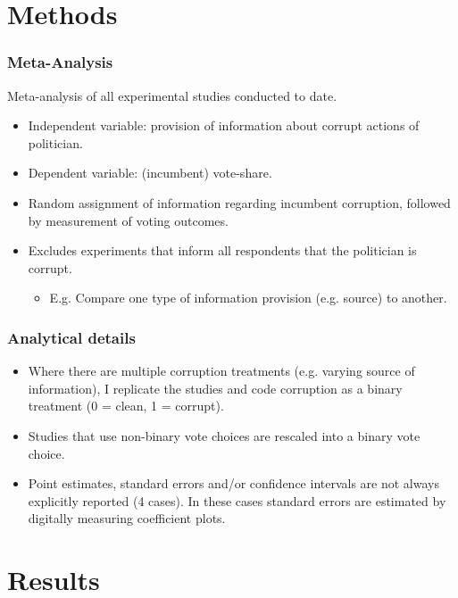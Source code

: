 \documentclass[usenames,dvipsnames]{beamer}
\begin{document}

\section{Methods}

\begin{frame}
\frametitle{Meta-Analysis}
Meta-analysis of all \textcolor{Cerulean}{experimental} studies conducted to date. 
\pause
\begin{itemize}
\item Independent variable: provision of information about corrupt actions of politician.
\pause
\item Dependent variable: (incumbent) vote-share.
\pause
\item Random assignment of information regarding
incumbent corruption, followed by measurement of voting outcomes.
\pause
\item Excludes experiments that inform all respondents that the politician is corrupt.
\begin{itemize}
\item E.g. Compare one type of information provision (e.g. source) to another.
\end{itemize}
\end{itemize}
\end{frame}


\begin{frame}
\frametitle{Analytical details}
\begin{itemize}
\item Where there are multiple corruption treatments (e.g. varying source of information), I replicate the studies and code corruption as a binary treatment (0 = clean, 1 = corrupt).
\pause
\item Studies that use non-binary vote choices are rescaled into a binary vote choice.
\pause
\item Point estimates, standard errors and/or confidence intervals are not always explicitly reported (4 cases). In these cases standard errors are estimated by digitally measuring coefficient plots.
\end{itemize}

\end{frame}


\section{Results}
\end{document}

